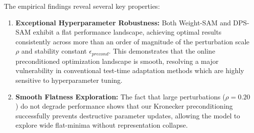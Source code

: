\documentclass{article}
\theoremstyle{plain}
\theoremstyle{definition}
\theoremstyle{remark}
\begin{document}
\begin{table}[tb]
  \caption{Hyperparameter sensitivity sweep results (Overall Accuracy \%) for our preconditioned sharpness-aware model merging variants (Weight-SAM and our proposed DPS-SAM).}
  \label{tab:sweep}
  \vskip 0.15in
  \begin{center}
    \begin{small}
    \end{small}
  \end{center}
  \vskip -0.1in
\end{table}

The empirical findings reveal several key properties:
\begin{enumerate}
  \item \textbf{Exceptional Hyperparameter Robustness:} Both Weight-SAM and DPS-SAM exhibit a flat performance landscape, achieving optimal results consistently across more than an order of magnitude of the perturbation scale $\rho$ and stability constant $\epsilon_{precond}$. This demonstrates that the online preconditioned optimization landscape is smooth, resolving a major vulnerability in conventional test-time adaptation methods which are highly sensitive to hyperparameter tuning.
  \item \textbf{Smooth Flatness Exploration:} The fact that large perturbations ($\rho = 0.20$) do not degrade performance shows that our Kronecker preconditioning successfully prevents destructive parameter updates, allowing the model to explore wide flat-minima without representation collapse.
\end{enumerate}
\end{document}
